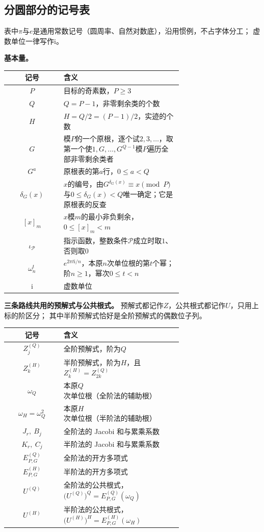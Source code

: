 \documentclass[UTF8,a4paper,11pt]{ctexart}
\newcommand{\ii}{\mathrm{i}}
\begin{document}
\subsection{分圆部分的记号表}
表中$\pi$与$e$是通用常数记号（圆周率、自然对数底），沿用惯例，不占字体分工；
虚数单位一律写作$\ii$。

\textbf{基本量。}
\begin{center}
\begin{tabular}{c|>{\raggedright\arraybackslash}p{0.68\linewidth}}
\toprule
记号 & 含义 \\
\midrule
$P$ & 目标的奇素数，$P\ge3$ \\
$Q$ & $Q=P-1$，非零剩余类的个数 \\
$H$ & $H=Q/2=(P-1)/2$，实迹的个数 \\
$G$ & 模$P$的一个原根，逐个试$2,3,\dots$，取第一个使$1,G,\dots,G^{Q-1}$模$P$遍历全部非零剩余类者 \\
$G^a$ & 原根表的第$a$行，$0\le a<Q$ \\
$\delta_G(x)$ & $x$的编号，由$G^{\delta_G(x)}\equiv x\pmod P$与$0\le\delta_G(x)<Q$唯一确定；它是原根表的反查 \\
$[x]_m$ & $x$模$m$的最小非负剩余，$0\le[x]_m<m$ \\
$\iota_{\mathscr{P}}$ & 指示函数，整数条件$\mathscr{P}$成立时取$1$、否则取$0$ \\
$\omega_n^t$ & $e^{2\pi t\ii/n}$，本原$n$次单位根的第$t$个幂；阶$n\ge1$，幂次$0\le t<n$ \\
$\ii$ & 虚数单位 \\
\bottomrule
\end{tabular}
\end{center}

\textbf{三条路线共用的预解式与公共根式。}
预解式都记作$Z$，公共根式都记作$U$，只用上标的阶区分；
其中半阶预解式恰好是全阶预解式的偶数位子列。
\begin{center}
\begin{tabular}{c|>{\raggedright\arraybackslash}p{0.68\linewidth}}
\toprule
记号 & 含义 \\
\midrule
$Z^{(Q)}_j$ & 全阶预解式，阶为$Q$ \\
$Z^{(H)}_k$ & 半阶预解式，阶为$H$，且$Z^{(H)}_k=Z^{(Q)}_{2k}$ \\
$\omega_Q$ & 本原$Q$次单位根（全阶法的辅助根） \\
$\omega_H=\omega_Q^2$ & 本原$H$次单位根（半阶法的辅助根） \\
$J_r,\ B_j$ & 全阶法的 Jacobi 和与累乘系数 \\
$K_r,\ C_j$ & 半阶法的 Jacobi 和与累乘系数 \\
$E^{(Q)}_{P,G}$ & 全阶法的开方多项式 \\
$E^{(H)}_{P,G}$ & 半阶法的开方多项式 \\
$U^{(Q)}$ & 全阶法的公共根式，$\bigl(U^{(Q)}\bigr)^{Q}=E^{(Q)}_{P,G}(\omega_Q)$ \\
$U^{(H)}$ & 半阶法的公共根式，$\bigl(U^{(H)}\bigr)^{H}=E^{(H)}_{P,G}(\omega_H)$ \\
\bottomrule
\end{tabular}
\end{center}
\end{document}
